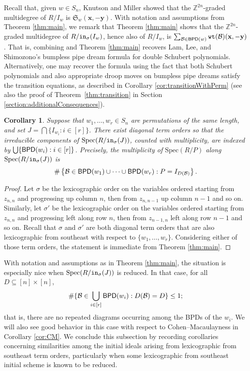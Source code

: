 \documentclass[12pt,reqno]{amsart}
\newtheorem{corollary}[theorem]{Corollary}
\newtheorem{Main Conjecture}[theorem]{Main Conjecture}
\theoremstyle{remark}
\theoremstyle{plain}
\newcommand{\init}{{\tt in}}
\newcommand{\bpd}{{\sf BPD}}
\newcommand{\wt}{{\tt wt}}
\newcommand{\spec}{{\mbox{Spec}}}
\begin{document}
Recall that, given $w \in S_n$, Knutson and Miller \cite[Theorem A]{KM05} showed that the $\mathbb{Z}^{2n}$-graded multidegree of $R/I_w$ is $\mathfrak S_w(\mathbf x, -\mathbf y)$. With notation and assumptions from Theorem \ref{thm:main}, we remark that Theorem \ref{thm:main} shows that the $\mathbb{Z}^{2n}$-graded multidegree of $R/\init_\sigma(I_w)$, hence also of $R/I_w$, is $\sum_{\mathcal B\in \bpd(w)}\wt(\mathcal B)(\mathbf x, -\mathbf y)$.  That is, combining \cite[Theorem A]{KM05} and Theorem \ref{thm:main} recovers Lam, Lee, and Shimozono's bumpless pipe dream formula for double Schubert polynomials.  Alternatively, one may recover the formula using the fact that both Schubert polynomials and also appropriate droop moves on bumpless pipe dreams satisfy the transition equations, as described in Corollary \ref{cor:transitionWithPerm} (see also the proof of Theorem~\ref{thm:transition} in Section \ref{section:additionalConsequences}).



\begin{corollary}\label{cor:mainCor}
Suppose that $w_1, \ldots, w_r \in S_n$ are permutations of the same length, and set $J=\bigcap \{I_{w_i}:i\in[r]\}$. There exist diagonal term orders so that the irreducible components of $\spec(R/\init_\sigma(J))$, counted with multiplicity, are indexed by 
$ \bigcup\{\bpd(w_i):i\in[r]\}$.  
Precisely, the multiplicity of $\spec(R/P)$ along $\spec(R/\init_\sigma(J))$ is \[
\#\left\{\mathcal{B} \in \bpd(w_1)\cup \cdots \cup \bpd(w_r) : P = I_{D(\mathcal{B})} \right\}.
\]
\end{corollary}
\begin{proof}
Let $\sigma$ be the lexicographic order on the variables ordered starting from $z_{n,n}$ and progressing up column $n$, then from $z_{n, n-1}$ up column $n-1$ and so on.  Similarly, let $\sigma'$ be the lexicographic order on the variables ordered starting from $z_{n,n}$ and progressing left along row $n$, then from $z_{n-1, n}$ left along row $n-1$ and so on.  Recall that $\sigma$ and $\sigma'$ are both diagonal term orders that are also lexicographic from southeast with respect to $\{w_1, \ldots, w_r\}$.  Considering either of those term orders, the statement is immediate from Theorem \ref{thm:main}.
\end{proof}


With notation and assumptions as in Theorem \ref{thm:main}, the situation is especially nice when $\spec(R/\init_\sigma(J))$ is reduced.  In that case, for all $D\subseteq [n]\times [n]$, \[\#\{\mathcal B\in \displaystyle\bigcup_{i\in[r]}\bpd(w_i):D(\mathcal B)=D\}\leq 1;\] that is, there are no repeated diagrams occurring among the BPDs of the $w_i$.  We will also see good behavior in this case with respect to Cohen--Macaulayness in Corollary \ref{cor:CM}. 
We conclude this subsection by recording corollaries concerning similarities among the initial ideals arising from lexicographic from southeast term orders, particularly when some lexicographic from southeast initial scheme is known to be reduced.
\end{document}

